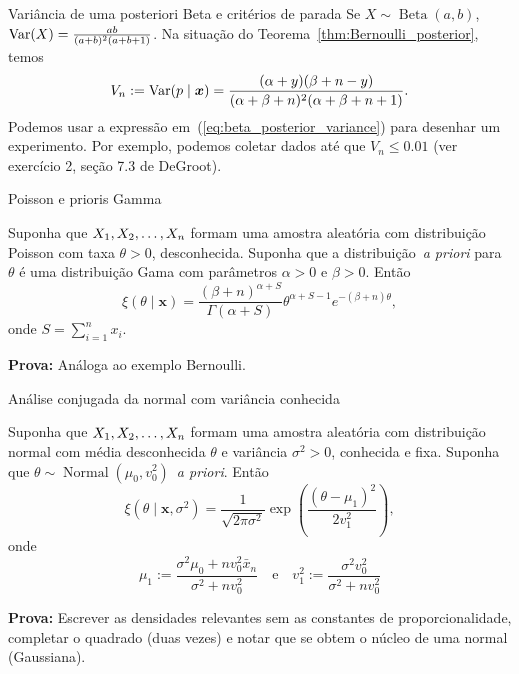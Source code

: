 \begin{frame}{Variância de uma posteriori Beta e critérios de parada}
 Se $X \sim \operatorname{Beta}(a, b)$, $\operatorname{Var}(X) = \frac{ab}{(a+b)^2(a + b+ 1)}$.
 Na situação do Teorema~\ref{thm:Bernoulli_posterior}, temos
 \begin{equation}
  \label{eq:beta_posterior_variance}
 V_n := \operatorname{Var}(p \mid \boldsymbol{x}) = \frac{(\alpha + y)(\beta + n - y)}{(\alpha + \beta + n)^2(\alpha + \beta + n + 1)}.  
 \end{equation}
 Podemos usar a expressão em~(\ref{eq:beta_posterior_variance}) para desenhar um experimento.
 Por exemplo, podemos coletar dados até que $V_n \leq 0.01$ (ver exercício 2, seção 7.3 de DeGroot). 
\end{frame}

\begin{frame}{Poisson e prioris Gamma}
 \begin{theo}
 \label{thm:Poisson_conjugate_inference}
  Suponha que $X_1, X_2, \ldots, X_n$ formam uma amostra aleatória com distribuição Poisson com taxa $\theta > 0$, desconhecida.
  Suponha que a distribuição~\textit{a priori} para $\theta$ é uma distribuição Gama com parâmetros $\alpha >0$ e $\beta > 0$.
  Então
  \begin{equation}
   \xi(\theta \mid \boldsymbol{x}) = \frac{ (\beta + n)^{\alpha + S} }{\Gamma(\alpha + S)} \theta^{\alpha+S-1} e^{-(\beta+n)\theta},
  \end{equation}
  onde $S = \sum_{i=1}^n x_i$.
 \end{theo}
\textbf{Prova:} Análoga ao exemplo Bernoulli.
\end{frame}

\begin{frame}{Análise conjugada da normal com variância conhecida}
 \begin{theo}
 \label{thm:posterior_normal_mean}
  Suponha que $X_1, X_2, \ldots, X_n$ formam uma amostra aleatória com distribuição normal com média desconhecida $\theta$ e variância $\sigma^2 >0$, conhecida e fixa.
  Suponha que $\theta \sim \operatorname{Normal}(\mu_0, v_0^2)$~\textit{a priori}.
  Então
  \begin{equation}
   \xi(\theta \mid \boldsymbol{x}, \sigma^2) =  \frac{1}{\sqrt{2\pi\sigma^2}} \exp\left( \frac{(\theta-\mu_1)^2}{2v_1^2} \right),
  \end{equation}
onde
\begin{equation}
\mu_1 := \frac{\sigma^2 \mu_0 + nv_0^2\bar{x}_n}{\sigma^2 + nv_0^2} \quad\text{e}\quad v_1^2 := \frac{\sigma^2v_0^2}{\sigma^2 + nv_0^2}
\end{equation}
\end{theo}
\textbf{Prova:} Escrever as densidades relevantes sem as constantes de proporcionalidade, completar o quadrado (duas vezes) e notar que se obtem o núcleo de uma normal (Gaussiana).
\end{frame}

